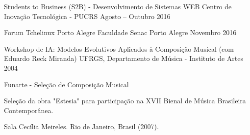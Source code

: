 \cvevent
{Students to Business (S2B) - Desenvolvimento de Sistemas WEB}
{Centro de Inovação Tecnológica - PUCRS}
{Agosto -- Outubro 2016}{}
\divider

\cvevent
{Forum Tchelinux Porto Alegre}
{Faculdade Senac Porto Alegre}
{Novembro 2016}{}
\divider

\cvevent
{Workshop de IA: Modelos Evolutivos Aplicados à Composição Musical (com Eduardo Reck Miranda)}
{UFRGS, Departamento de Música - Instituto de Artes}
{2004}{}

\medskip
% 
% 
% 

\cvachievement{\faTrophy}
{Funarte - Seleção de Composição Musical}
{Seleção da obra "Estesia" para participação na XVII Bienal de Música Brasileira Contemporânea.

Sala Cecília Meireles. Rio de Janeiro, Brasil (2007).
}
% 
% 
% 
